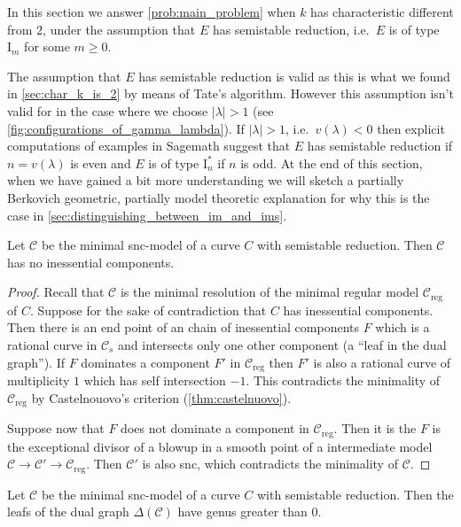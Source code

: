 In this section we answer \cref{prob:main_problem} when $k$ has characteristic different from $2$, under the assumption that $E$ has semistable reduction, i.e.\  $E$ is of type $\mathrm I_m$ for some $m \ge 0$. 

\begin{remark}\label{rem:justification_semistable}
	The assumption that $E$ has semistable reduction is valid as this is what we found in \cref{sec:char_k_is_2} by means of Tate's algorithm. 
	However this assumption isn't valid for in the case where we choose $|\lambda| > 1$ (see \cref{fig:configurations_of_gamma_lambda}).
	If $|\lambda| > 1$, i.e.\ $v(\lambda) < 0$ then
	explicit computations of examples in Sagemath suggest that  $E$ has semistable reduction if $n = v(\lambda)$ is even and $E$ is of type $\mathrm I^*_n$ if $n$ is odd. 
	At the end of this section, when we have gained a bit more understanding we will sketch a partially Berkovich geometric, partially model theoretic explanation for why this is the case in \cref{sec:distinguishing_between_im_and_ims}. 
\end{remark}

\begin{lemma}\label{lem:semistable_skeleton}
	Let $\mathscr C$ be the minimal snc-model of a curve $C$ with semistable reduction.
	Then $\mathscr C$ has no inessential components. 
\end{lemma}
\begin{proof}
	Recall that $\mathscr C$ is the minimal resolution of the minimal regular model $\mathscr C_\text{reg} $ of $C$. 
	Suppose for the sake of contradiction that  $C$ has inessential components.
	Then there is an end point of an chain of inessential components $F$ which is a rational curve in $\mathscr C_s$ and intersects only one other component (a ``leaf in the dual graph''). 
	If $F$ dominates a component $F'$ in $\mathscr C_\text{reg} $ then $F'$ is also a rational curve of multiplicity $1$ which has self intersection $-1$.
	This contradicts the minimality of  $\mathscr C _\text{reg} $ by Castelnouovo's criterion (\cref{thm:castelnuovo}). 

	Suppose now that $F$ does not dominate a component in $\mathscr C_\text{reg} $.
	Then it is the $F$ is the exceptional divisor of a blowup in a smooth point of a intermediate model $\mathscr C \to \mathscr C' \to \mathscr C_\text{reg} $. 
	Then $\mathscr C'$ is also snc, which contradicts the minimality of $\mathscr C$. 
\end{proof}
\begin{corollary}
	Let $\mathscr C$ be the minimal snc-model of a curve $C$ with semistable reduction. 
	Then the leafs of the dual graph  $\Delta (\mathscr C)$ have genus greater than $0$. 
\end{corollary}

